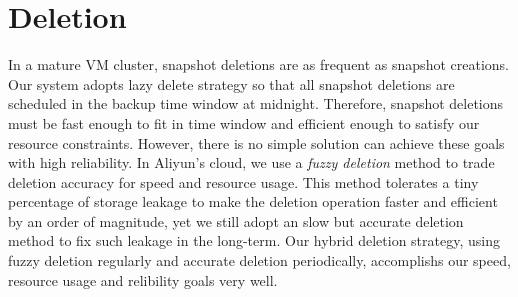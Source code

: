 \section{Deletion}
In a mature VM cluster, snapshot deletions are as frequent as snapshot creations.
Our system adopts lazy delete strategy so that all snapshot deletions are scheduled
in the backup time window at midnight. 
Therefore, snapshot deletions must be fast enough to fit in time window and
efficient enough to satisfy our resource constraints.
However, there is no simple solution can achieve these goals with high reliability.
In Aliyun's cloud, we use a {\em fuzzy deletion} method to trade deletion accuracy for
speed and resource usage. This method tolerates a tiny percentage of storage leakage
to make the deletion operation faster and efficient by an order of magnitude,
yet we still adopt an slow but accurate deletion method to fix such leakage in the long-term.
Our hybrid deletion strategy, using fuzzy deletion regularly and accurate deletion periodically,
accomplishs our speed, resource usage and relibility goals very well.





